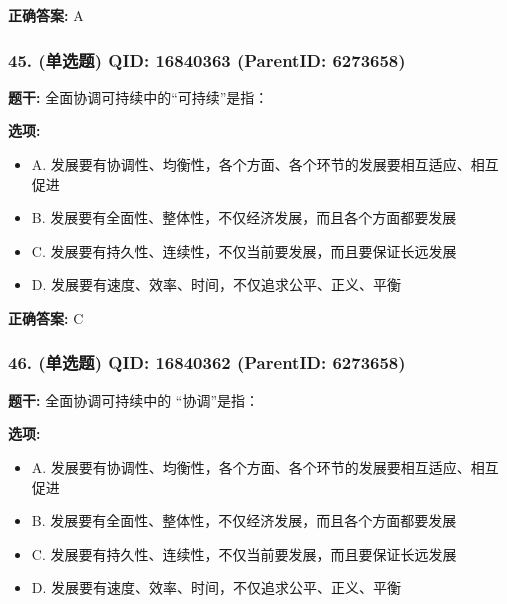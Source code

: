 \documentclass[12pt,UTF8]{ctexart}
\begin{document}
\textbf{正确答案:}
A

\vspace{0.3em}\hrulefill\vspace{0.7em}

\subsubsection*{45. (单选题) \small QID: 16840363 (ParentID: 6273658)}

\textbf{题干:}
全面协调可持续中的“可持续”是指：



\textbf{选项:}
\begin{itemize}[leftmargin=*]

  \item A. 发展要有协调性、均衡性，各个方面、各个环节的发展要相互适应、相互促进

  \item B. 发展要有全面性、整体性，不仅经济发展，而且各个方面都要发展

  \item C. 发展要有持久性、连续性，不仅当前要发展，而且要保证长远发展

  \item D. 发展要有速度、效率、时间，不仅追求公平、正义、平衡

\end{itemize}

\textbf{正确答案:}
C

\vspace{0.3em}\hrulefill\vspace{0.7em}

\subsubsection*{46. (单选题) \small QID: 16840362 (ParentID: 6273658)}

\textbf{题干:}
全面协调可持续中的 “协调”是指：



\textbf{选项:}
\begin{itemize}[leftmargin=*]

  \item A. 发展要有协调性、均衡性，各个方面、各个环节的发展要相互适应、相互促进

  \item B. 发展要有全面性、整体性，不仅经济发展，而且各个方面都要发展

  \item C. 发展要有持久性、连续性，不仅当前要发展，而且要保证长远发展

  \item D. 发展要有速度、效率、时间，不仅追求公平、正义、平衡

\end{itemize}
\end{document}
